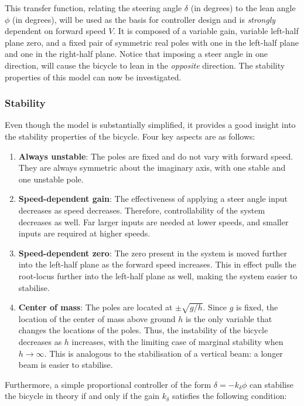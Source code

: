This transfer function, relating the steering angle $\delta$ (in degrees) to the lean angle $\phi$ (in degrees), will be used as the basis for controller design and is \textit{strongly} dependent on forward speed $V$. It is composed of a variable gain, variable left-half plane zero, and a fixed pair of symmetric real poles with one in the left-half plane and one in the right-half plane. Notice that imposing a steer angle in one direction, will cause the bicycle to lean in the \textit{opposite} direction. The stability properties of this model can now be investigated. 

\subsubsection{Stability}
Even though the model is substantially simplified, it provides a good insight into the stability properties of the bicycle. Four key aspects are as follows:

\begin{enumerate}
\item{\textbf{Always unstable}: The poles are fixed and do not vary with forward speed. They are always symmetric about the imaginary axis, with one stable and one unstable pole.}
\item{\textbf{Speed-dependent gain}: The effectiveness of applying a steer angle input decreases as speed decreases. Therefore, controllability of the system decreases as well. Far larger inputs are needed at lower speeds, and smaller inputs are required at higher speeds.}
\item{\textbf{Speed-dependent zero}: The zero present in the system is moved further into the left-half plane as the forward speed increases. This in effect pulls the root-locus further into the left-half plane as well, making the system easier to stabilise.}
\item{\textbf{Center of mass}: The poles are located at $\pm \sqrt{g/h}$. Since $g$ is fixed, the location of the center of mass above ground $h$ is the only variable that changes the locations of the poles. Thus, the instability of the bicycle decreases as $h$ increases, with the limiting case of marginal stability when $h \rightarrow \infty$. This is analogous to the stabilisation of a vertical beam: a longer beam is easier to stabilise.}
\end{enumerate}

Furthermore, a simple proportional controller of the form $\delta=-k_{\delta} \phi$ can stabilise the bicycle in theory if and only if the gain $k_{\delta}$ satisfies the following condition:

